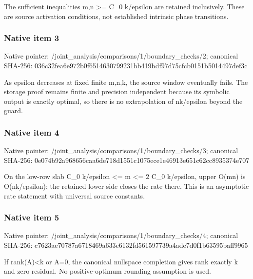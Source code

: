 \documentclass[10pt,a4paper]{article}
\begin{document}
\begingroup\raggedright\sloppy The sufficient inequalities m,\allowbreak{}n >=\allowbreak{} C\_\allowbreak{}0 k/\allowbreak{}epsilon are retained inclusively. These are source activation conditions,\allowbreak{} not established intrinsic phase transitions.\par\endgroup

\subsubsection{Native item 3}
Native pointer: /joint\_\allowbreak{}analysis/comparisons/1/boundary\_\allowbreak{}checks/2; canonical SHA-256: 036c32fea6e972b0f6514630799231bb419bdf97d75cfcb0151b5014497def3c

\begingroup\raggedright\sloppy As epsilon decreases at fixed finite m,\allowbreak{}n,\allowbreak{}k,\allowbreak{} the source window eventually fails. The storage proof remains finite and precision independent because its symbolic output is exactly optimal,\allowbreak{} so there is no extrapolation of nk/\allowbreak{}epsilon beyond the guard.\par\endgroup

\subsubsection{Native item 4}
Native pointer: /joint\_\allowbreak{}analysis/comparisons/1/boundary\_\allowbreak{}checks/3; canonical SHA-256: 0e074b92a968656caa6de718d1551c1075ece1e46913e651c62cc8935374e707

\begingroup\raggedright\sloppy On the low-row slab C\_\allowbreak{}0 k/\allowbreak{}epsilon <=\allowbreak{} m <=\allowbreak{} 2 C\_\allowbreak{}0 k/\allowbreak{}epsilon,\allowbreak{} upper O(mn) is O(nk/\allowbreak{}epsilon);\allowbreak{} the retained lower side closes the rate there. This is an asymptotic rate statement with universal source constants.\par\endgroup

\subsubsection{Native item 5}
Native pointer: /joint\_\allowbreak{}analysis/comparisons/1/boundary\_\allowbreak{}checks/4; canonical SHA-256: c7623ae70787a6718469a633e6132fd561597739a4ade7d0f1b63595baff9965

\begingroup\raggedright\sloppy If rank(A)<k or A=\allowbreak{}0,\allowbreak{} the canonical nullspace completion gives rank exactly k and zero residual. No positive-optimum rounding assumption is used.\par\endgroup
\end{document}
